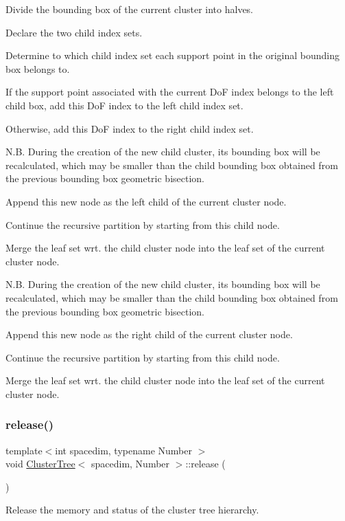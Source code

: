 Divide the bounding box of the current cluster into halves.

Declare the two child index sets.

Determine to which child index set each support point in the original bounding box belongs to.

If the support point associated with the current DoF index belongs to the left child box, add this DoF index to the left child index set.

Otherwise, add this DoF index to the right child index set.

N.\+B. During the creation of the new child cluster, its bounding box will be recalculated, which may be smaller than the child bounding box obtained from the previous bounding box geometric bisection.

Append this new node as the left child of the current cluster node.

Continue the recursive partition by starting from this child node.

Merge the leaf set wrt. the child cluster node into the leaf set of the current cluster node.

N.\+B. During the creation of the new child cluster, its bounding box will be recalculated, which may be smaller than the child bounding box obtained from the previous bounding box geometric bisection.

Append this new node as the right child of the current cluster node.

Continue the recursive partition by starting from this child node.

Merge the leaf set wrt. the child cluster node into the leaf set of the current cluster node.\mbox{\label{classClusterTree_a2dc8b94ebdc4e5efb885940204f614e1}} 
\subsubsection{\texorpdfstring{release()}{release()}}
{\footnotesize\ttfamily template$<$int spacedim, typename Number $>$ \\
void \hyperlink{classClusterTree}{Cluster\+Tree}$<$ spacedim, Number $>$\+::release (\begin{DoxyParamCaption}{ }\end{DoxyParamCaption})}

Release the memory and status of the cluster tree hierarchy. 


